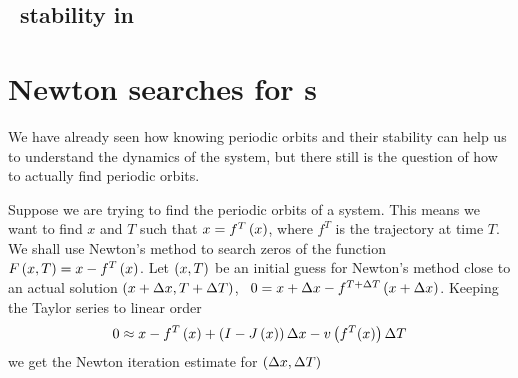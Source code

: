 {\subsection{\Rpo\ stability in \reducedsp}


\section{Newton searches for \po s}

We have already seen how knowing periodic orbits and their
stability can help us to understand the dynamics of the
system, but there still is the question of how to actually
find periodic orbits.

Suppose we are trying to find the periodic orbits of a
system. This means we want to find $x$ and $T$ such that $x =
f^T\left(x\right)$,
where $f^T$ is the trajectory at
time $T$. We shall use Newton's method to search zeros of the function
$F\left(x,T\right) = x - f^T\left(x\right)$. Let
$\left(x,T\right)$ be an initial guess for Newton's method
close to an actual solution $\left(x + \Delta x,T + \Delta
T\right)$, \ie\ $0 = x +\Delta x - f^{T+\Delta
T}\left(x + \Delta x\right)$. Keeping the Taylor series
to linear order
\[
0 \approx x-
f^T\left(x\right) + \left(I -
J\left(x\right)\right)\Delta x -
v\left(f^T(x)\right)\Delta T
\]
we get the Newton iteration estimate for
$(\Delta x,\Delta T)$

}
